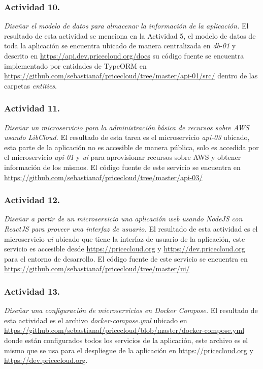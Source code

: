 \subsubsection{Actividad 10.}
\emph{Diseñar el modelo de datos para almacenar la información de la aplicación.} El resultado de esta actividad se menciona en la Actividad 5, el modelo de datos de toda la aplicación se encuentra ubicado de manera centralizada en \emph{db-01} y descrito en \url{https://api.dev.pricecloud.org/docs} su código fuente se encuentra implementado por entidades de \gls{TypeORM} en \url{https://github.com/sebastianaf/pricecloud/tree/master/api-01/src/} dentro de las carpetas \emph{entities}.
\newline\newline

\subsubsection{Actividad 11.}
\emph{Diseñar un microservicio para la administración básica de recursos sobre \acrshort{AWS} usando \gls{LibCloud}.} El resultado de esta tarea es el microservicio \emph{api-03} ubicado, esta parte de la aplicación no es accesible de manera pública, solo es accedida por el microservicio \emph{api-01} y \emph{ui} para aprovisionar recursos sobre \acrshort{AWS} y obtener información de los mismos. El código fuente de este servicio se encuentra en \url{https://github.com/sebastianaf/pricecloud/tree/master/api-03/}
\newline\newline

\subsubsection{Actividad 12.}
\emph{Diseñar a partir de un microservicio una aplicación web usando \emph{NodeJS} con \emph{ReactJS} para proveer una interfaz de usuario.} El resultado de esta actividad es el microservicio \emph{ui} ubicado que tiene la interfaz de usuario de la aplicación, este servicio es accesible desde \url{https://pricecloud.org} y \url{https://dev.pricecloud.org} para el entorno de desarrollo. El código fuente de este servicio se encuentra en \url{https://github.com/sebastianaf/pricecloud/tree/master/ui/}
\newline\newline

\subsubsection{Actividad 13.}
\emph{Diseñar una configuración de microservicios en \gls{Docker Compose}.} El resultado de esta actividad es el archivo \emph{docker-compose.yml} ubicado en \url{https://github.com/sebastianaf/pricecloud/blob/master/docker-compose.yml} donde están configurados todos los servicios de la aplicación, este archivo es el mismo que se usa para el despliegue de la aplicación en \url{https://pricecloud.org} y \url{https://dev.pricecloud.org}.
\newline\newline

